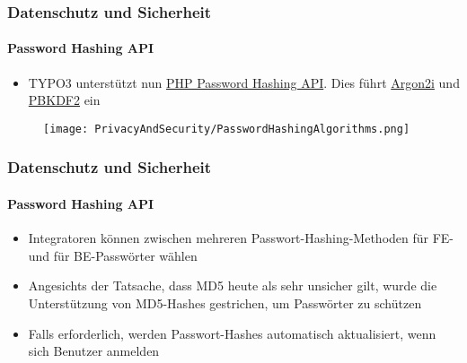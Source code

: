 
\begin{frame}[fragile]
	\frametitle{Datenschutz und Sicherheit}
	\framesubtitle{Password Hashing API}

	\begin{itemize}
		\item TYPO3 unterstützt nun
			\href{https://secure.php.net/manual/en/ref.password.php}{PHP Password Hashing API}.
			Dies führt 
			\href{https://en.wikipedia.org/wiki/Argon2}{Argon2i}
			und
			\href{https://en.wikipedia.org/wiki/PBKDF2}{PBKDF2} ein
	\end{itemize}

	\begin{figure}
		\texttt{[image: PrivacyAndSecurity/PasswordHashingAlgorithms.png]}
	\end{figure}

\end{frame}


\begin{frame}[fragile]
	\frametitle{Datenschutz und Sicherheit}
	\framesubtitle{Password Hashing API}

	\begin{itemize}
		\item Integratoren können zwischen mehreren Passwort-Hashing-Methoden 
			für FE- und für BE-Passwörter wählen
		\item Angesichts der Tatsache, dass MD5 heute als sehr unsicher gilt, 
			wurde die Unterstützung von MD5-Hashes gestrichen, um Passwörter zu schützen
		\item Falls erforderlich, werden Passwort-Hashes automatisch aktualisiert, wenn sich
			Benutzer anmelden
	\end{itemize}

\end{frame}


